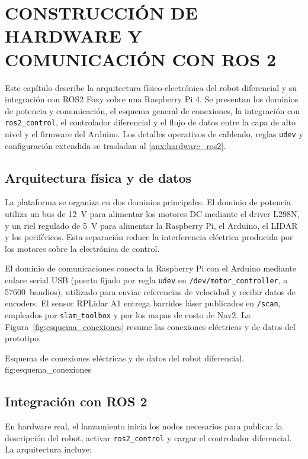 \chapter{CONSTRUCCIÓN DE HARDWARE Y COMUNICACIÓN CON ROS 2}
\label{chap:robot_real}

Este capítulo describe la arquitectura físico-electrónica del robot diferencial y su integración con \gls{ROS2} Foxy sobre una Raspberry Pi 4. Se presentan los dominios de potencia y comunicación, el esquema general de conexiones, la integración con \texttt{ros2\_control}, el controlador diferencial y el flujo de datos entre la capa de alto nivel y el firmware del \gls{Arduino}. Los detalles operativos de cableado, reglas \texttt{udev} y configuración extendida se trasladan al \ref{anx:hardware_ros2}.

\section{Arquitectura física y de datos}

La plataforma se organiza en dos dominios principales. El dominio de potencia utiliza un bus de 12~V para alimentar los motores DC mediante el driver L298N, y un riel regulado de 5~V para alimentar la Raspberry Pi, el \gls{Arduino}, el \gls{LIDAR} y los periféricos. Esta separación reduce la interferencia eléctrica producida por los motores sobre la electrónica de control.

El dominio de comunicaciones conecta la Raspberry Pi con el \gls{Arduino} mediante enlace serial USB (puerto fijado por regla \texttt{udev} en \texttt{/dev/motor\_controller}, a 57600~baudios), utilizado para enviar referencias de velocidad y recibir datos de encoders. El sensor RPLidar A1 entrega barridos láser publicados en \texttt{/scan}, empleados por \texttt{slam\_toolbox} y por los mapas de costo de Nav2. La Figura~\ref{fig:esquema_conexiones} resume las conexiones eléctricas y de datos del prototipo.

{Esquema de conexiones eléctricas y de datos del robot diferencial.}
{fig:esquema_conexiones}

\section{Integración con ROS 2}

En hardware real, el lanzamiento  inicia los nodos necesarios para publicar la descripción del robot, activar \texttt{ros2\_control} y cargar el controlador diferencial. La arquitectura incluye:

